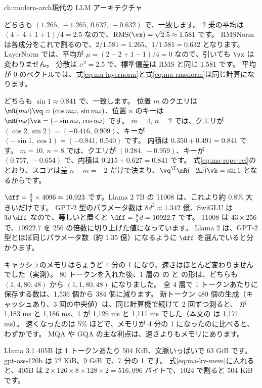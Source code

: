 \begin{answers}{ch:modern-arch}{現代の LLM アーキテクチャ}
\item どちらも $(1.265,\,-1.265,\,0.632,\,-0.632)$ で、一致します。
2 乗の平均は $(4+4+1+1)/4=2.5$ なので、$\mathrm{RMS}(\vx)=\sqrt{2.5}\approx1.581$ です。
RMSNorm は各成分をこれで割るので、$2/1.581=1.265$、$1/1.581=0.632$ となります。
LayerNorm では、平均が $\mu=(2-2+1-1)/4=0$ なので、引いても $\vx$ は変わりません。
分散は $\sigma^2=2.5$ で、標準偏差は RMS と同じ $1.581$ です。
平均が 0 のベクトルでは、式\eqref{eq:ma-layernorm}と式\eqref{eq:ma-rmsnorm}は同じ計算になります。
\item どちらも $\sin1\approx0.841$ で、一致します。
位置 $m$ のクエリは $\mR(m\omega)\vq=(\cos m\omega,\,\sin m\omega)$、位置 $n$ のキーは $\mR(n\omega)\vk=(-\sin n\omega,\,\cos n\omega)$ です。
$m=4,\,n=2$ では、クエリが $(\cos2,\sin2)=(-0.416,\,0.909)$、キーが $(-\sin1,\cos1)=(-0.841,\,0.540)$ です。
内積は $0.350+0.491=0.841$ です。
$m=10,\,n=8$ では、クエリが $(0.284,\,-0.959)$、キーが $(0.757,\,-0.654)$ で、内積は $0.215+0.627=0.841$ です。
式\eqref{eq:ma-rope-rel}のとおり、スコアは差 $n-m=-2$ だけで決まり、$\vq^\T\mR(-2\omega)\vk=\sin1$ となるからです。
\item $\dff=\frac{8}{3}\times4096\approx10{,}923$ です。Llama 2 7B の 11008 は、これより約 0.8\% 大きいだけです。
GPT-2 型のパラメータ数は $8d^2\approx1.342$ 億、SwiGLU は $3d\,\dff$ なので、等しいと置くと $\dff=\frac83d=10922.7$ です。
11008 は $43\times256$ で、$10922.7$ を 256 の倍数に切り上げた値になっています。
Llama 2 は、GPT-2 型とほぼ同じパラメータ数（約 1.35 億）になるように $\dff$ を選んでいると分かります。
\item キャッシュのメモリはちょうど 4 分の 1 になり、速さはほとんど変わりませんでした（実測）。
80 トークンを入れた後、1 層の  の  と  の形は、どちらも $(1,4,80,48)$ から $(1,1,80,48)$ になりました。
全 4 層で 1 トークンあたりに保存する数は、1,536 個から 384 個に減ります。
新トークン 480 個の生成（キャッシュあり、3 回の中央値）は、同じ計算機で続けて 2 回ずつ測ると、 が 1,183 ms と 1,186 ms、1 が 1,126 ms と 1,111 ms でした（本文の  は 1,171 ms）。
速くなったのは 5\% ほどで、メモリが 4 分の 1 になったのに比べると、わずかです。
MQA や GQA の主な利点は、速さよりもメモリにあります。
\item Llama 3.1 405B は 1 トークンあたり 504 KiB、文脈いっぱいで 63 GiB です。gpt-oss-120b は 72 KiB、9 GiB で、7 分の 1 です。
式\eqref{eq:ma-kv-mem}に入れると、405B は $2\times126\times8\times128\times2=516{,}096$ バイトで、1024 で割ると 504 KiB です。

\end{answers}
